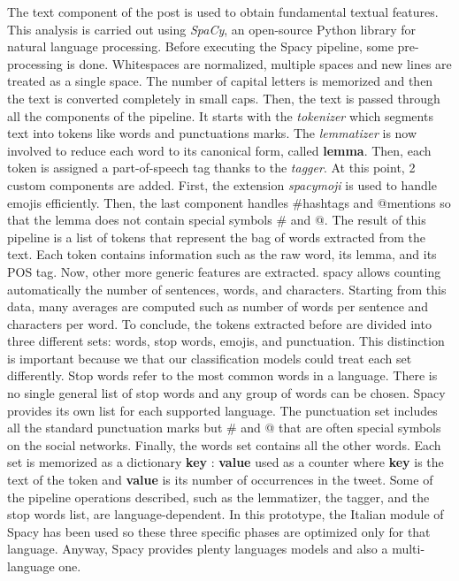 The text component of the post is used to obtain fundamental textual features. This analysis is carried out using \textit{SpaCy}, an open-source Python library for natural language processing.
Before executing the Spacy pipeline, some pre-processing is done. Whitespaces are normalized, multiple spaces and new lines are treated as a single space. The number of capital letters is memorized and then the text is converted completely in small caps.
Then, the text is passed through all the components of the pipeline. It starts with the \textit{tokenizer} which segments text into tokens like words and punctuations marks. The \textit{lemmatizer} is now involved to reduce each word to its canonical form, called \textbf{lemma}. Then, each token is assigned a part-of-speech tag thanks to the \textit{tagger}.
At this point, 2 custom components are added. First, the extension \textit{spacymoji} is used to handle emojis efficiently. Then, the last component handles \#hashtags and @mentions so that the lemma does not contain special symbols \# and @.
The result of this pipeline is a list of tokens that represent the bag of words extracted from the text. Each token contains information such as the raw word, its lemma, and its POS tag.
Now, other more generic features are extracted. spacy allows counting automatically the number of sentences, words, and characters. Starting from this data, many averages are computed such as number of words per sentence and characters per word.
To conclude, the tokens extracted before are divided into three different sets: words, stop words, emojis, and punctuation.
This distinction is important because we that our classification models could treat each set differently.
Stop words refer to the most common words in a language. There is no single general list of stop words and any group of words can be chosen. Spacy provides its own list for each supported language.
The punctuation set includes all the standard punctuation marks but \# and @ that are often special symbols on the social networks.
Finally, the words set contains all the other words.
Each set is memorized as a dictionary {\textbf{key} : \textbf{value}} used as a counter where \textbf{key} is the text of the token and \textbf{value} is its number of occurrences in the tweet.  
Some of the pipeline operations described, such as the lemmatizer, the tagger, and the stop words list, are language-dependent. In this prototype, the Italian module of Spacy has been used so these three specific phases are optimized only for that language. Anyway, Spacy provides plenty languages models and also a multi-language one.

